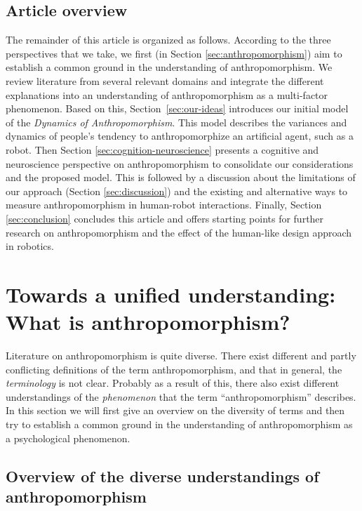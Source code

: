 \documentclass{frontiersSCNS} %
\begin{document}
\subsection{Article overview}

The remainder of this article is organized as follows.  According to the three
perspectives that we take, we first (in Section \ref{sec:anthropomorphism}) aim
to establish a common ground in the understanding of anthropomorphism. We review
literature from several relevant domains and integrate the different
explanations into an understanding of anthropomorphism as a multi-factor
phenomenon.  Based on this, Section~\ref{sec:our-ideas} introduces our initial
model of the \textit{Dynamics of Anthropomorphism}. This model describes the
variances and dynamics of people's tendency to anthropomorphize an artificial
agent, such as a robot.  Then Section \ref{sec:cognition-neuroscience} presents
a cognitive and neuroscience perspective on anthropomorphism to consolidate our
considerations and the proposed model.  This is followed by a discussion about
the limitations of our approach (Section \ref{sec:discussion}) and the existing
and alternative ways to measure anthropomorphism in human-robot interactions.
Finally, Section \ref{sec:conclusion} concludes this article and offers starting
points for further research on anthropomorphism and the effect of the human-like
design approach in robotics.


%
%
%
%
%
%

\section{Towards a unified understanding: What is anthropomorphism?}
\label{sec:definitions}

Literature on anthropomorphism is quite diverse. There exist different and
partly conflicting definitions of the term anthropomorphism, and that in
general, the \textit{terminology} is not clear. Probably as a result of this,
there also exist different understandings of the \textit{phenomenon} that the
term ``anthropomorphism'' describes.  In this section we will first give an
overview on the diversity of terms and then try to establish a common ground in
the understanding of anthropomorphism as a psychological phenomenon.

\subsection{Overview of the diverse understandings of anthropomorphism}
\end{document}
